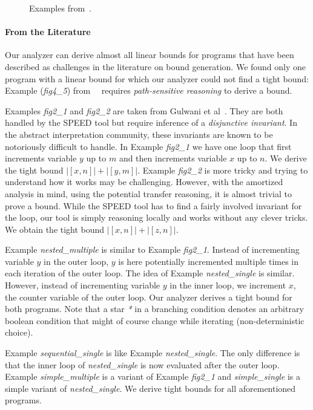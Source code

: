 \documentclass[nocopyrightspace,preprint,pldi]{sigplanconf-pldi15}
\begin{document}
{\begin{figure}
   \caption{Examples from~\cite{GulwaniZ10}.}
  \label{fig:cat3a}
\end{figure}


\paragraph{From  the Literature}

Our analyzer can derive almost all linear bounds for programs that
have been described as challenges in the literature on bound
generation.  We found only one program with a linear bound for
which our analyzer could not find a tight bound:  Example
(\emph{fig4\_5}) from~~\cite{GulwaniJK09} requires \emph{path-sensitive
  reasoning} to derive a bound.

Examples \emph{fig2\_1} and \emph{fig2\_2} are taken from Gulwani et
al~\cite{GulwaniMC09}.  They are both handled by the SPEED tool but
require inference of a \emph{disjunctive invariant}.  In the abstract
interpretation community, these invariants are known to be notoriously
difficult to handle.
%
In Example \emph{fig2\_1} we have one loop that first increments
variable $y$ up to $m$ and then increments variable $x$ up to $n$.  We
derive the tight bound $|[x, n]| + |[y, m]|$.
%
Example \emph{fig2\_2} is more tricky and trying to understand how it
works may be challenging.  However, with the amortized analysis in
mind, using the potential transfer reasoning, it is almost trivial to
prove a bound.  While the SPEED tool has to find a fairly
involved invariant for the loop, our tool is simply reasoning locally
and works without any clever tricks. We obtain the tight bound $|[x,
n]| + |[z, n]|$.

Example \emph{nested\_multiple} is similar to Example \emph{fig2\_1}.
Instead of incrementing variable $y$ in the outer loop, $y$ is here
potentially incremented multiple times in each iteration of the outer
loop.  The idea of Example \emph{nested\_single} is similar.  However,
instead of incrementing variable $y$ in the inner loop, we increment
$x$, the counter variable of the outer loop. Our analyzer derives a
tight bound for both programs.  Note that a star \emph{*} in a
branching condition denotes an arbitrary boolean condition that might
of course change while iterating (non-deterministic choice).

Example \emph{sequential\_single} is like Example
\emph{nested\_single}.  The only difference is that the inner loop of
\emph{nested\_single} is now evaluated after the outer loop.  Example
\emph{simple\_multiple} is a variant of Example \emph{fig2\_1} and
\emph{simple\_single} is a simple variant of \emph{nested\_single}.
We derive tight bounds for all aforementioned programs.

}
\end{document}
